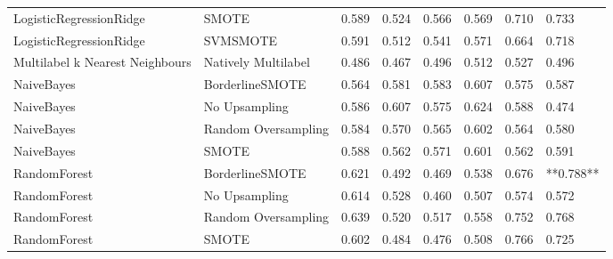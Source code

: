 \begin{tabular}{llllllll}
        LogisticRegressionRidge &                         SMOTE & 0.589 &                     0.524 &                 0.566 &                  0.569 &                                   0.710 &     0.733 \\
        LogisticRegressionRidge &                      SVMSMOTE & 0.591 &                     0.512 &                 0.541 &                  0.571 &                                   0.664 &     0.718 \\
Multilabel k Nearest Neighbours &           Natively Multilabel & 0.486 &                     0.467 &                 0.496 &                  0.512 &                                   0.527 &     0.496 \\
                     NaiveBayes &               BorderlineSMOTE & 0.564 &                     0.581 &                 0.583 &                  0.607 &                                   0.575 &     0.587 \\
                     NaiveBayes &                 No Upsampling & 0.586 &                     0.607 &                 0.575 &                  0.624 &                                   0.588 &     0.474 \\
                     NaiveBayes &           Random Oversampling & 0.584 &                     0.570 &                 0.565 &                  0.602 &                                   0.564 &     0.580 \\
                     NaiveBayes &                         SMOTE & 0.588 &                     0.562 &                 0.571 &                  0.601 &                                   0.562 &     0.591 \\
                   RandomForest &               BorderlineSMOTE & 0.621 &                     0.492 &                 0.469 &                  0.538 &                                   0.676 & **0.788** \\
                   RandomForest &                 No Upsampling & 0.614 &                     0.528 &                 0.460 &                  0.507 &                                   0.574 &     0.572 \\
                   RandomForest &           Random Oversampling & 0.639 &                     0.520 &                 0.517 &                  0.558 &                                   0.752 &     0.768 \\
                   RandomForest &                         SMOTE & 0.602 &                     0.484 &                 0.476 &                  0.508 &                                   0.766 &     0.725 \\

\end{tabular}
